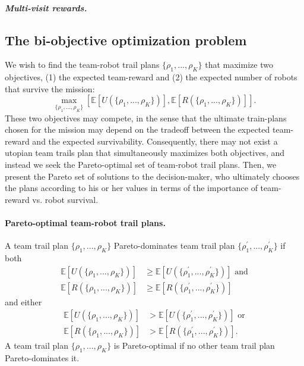\documentclass[11pt, oneside]{article}
\begin{document}
\subparagraph{Multi-visit rewards.}

\subsection{The bi-objective optimization problem}
We wish to find the team-robot trail plans $\{\rho_1, ..., \rho_K\}$ that maximize two objectives, (1) the expected team-reward and (2) the expected number of robots that survive the mission:
\begin{equation}
\max_{\{\rho_1, ..., \rho_K\}} [\mathbb{E}[U(\{\rho_1, ..., \rho_K\})], \mathbb{E}[R(\{\rho_1, ..., \rho_K\})]].
\end{equation}
These two objectives may compete, in the sense that the ultimate train-plans chosen for the mission may depend on the tradeoff between the expected team-reward and the expected survivability. Consequently, there may not exist a utopian team trails plan that simultaneously maximizes both objectives, and instead we seek the Pareto-optimal set of team-robot trail plans. Then, we present the Pareto set of solutions to the decision-maker, who ultimately chooses the plans according to his or her values in terms of the importance of team-reward vs. robot survival. 

\paragraph{Pareto-optimal team-robot trail plans.} A team trail plan $\{\rho_1, ..., \rho_K\}$ Pareto-dominates team trail plan  $\{\rho_1^\prime, ..., \rho_K^\prime\}$ if both
\begin{align}
	\mathbb{E}[U(\{\rho_1, ..., \rho_K\})] & \geq \mathbb{E}[U(\{\rho_1^\prime, ..., \rho_K^\prime\})]  \text{ and} \\
	\mathbb{E}[R(\{\rho_1, ..., \rho_K\})] & \geq \mathbb{E}[R(\{\rho_1^\prime, ..., \rho_K^\prime\})] 
\end{align}
and either
\begin{align}
	\mathbb{E}[U(\{\rho_1, ..., \rho_K\})] &> \mathbb{E}[U(\{\rho_1^\prime, ..., \rho_K^\prime\})]  \text{ or} \\
	\mathbb{E}[R(\{\rho_1, ..., \rho_K\})] & > \mathbb{E}[R(\{\rho_1^\prime, ..., \rho_K^\prime\})] .
\end{align}
A team trail plan $\{\rho_1, ..., \rho_K\}$ is Pareto-optimal if no other team trail plan Pareto-dominates it.


\end{document}
